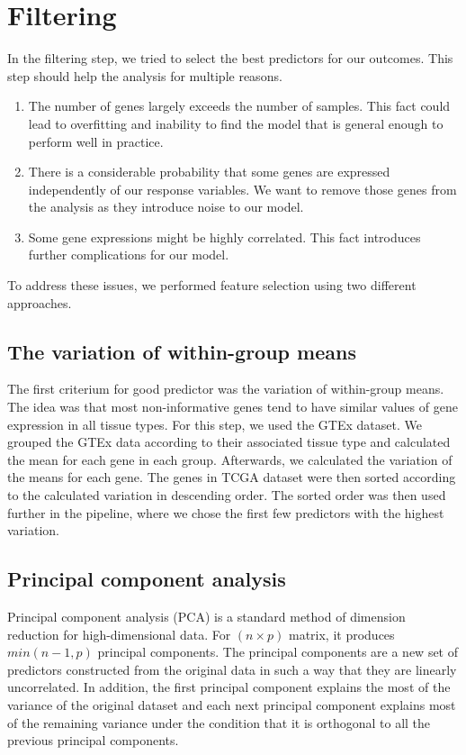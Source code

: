 \section{Filtering}
In the filtering step, we tried to select the best predictors for our outcomes.
This step should help the analysis for multiple reasons.
\begin{enumerate}
    \item The number of genes largely exceeds the number of samples. This fact could lead to overfitting and inability to find the model that is general enough to perform well in practice.
    \item There is a considerable probability that some genes are expressed independently of our response variables. We want to remove those genes from the analysis as they introduce noise to our model.
    \item Some gene expressions might be highly correlated. This fact introduces further complications for our model.
\end{enumerate}
To address these issues, we performed feature selection using two different approaches.

\subsection{The variation of within-group means}
The first criterium for good predictor was the variation of within-group means.
The idea was that most non-informative genes tend to have similar values of gene expression in all tissue types.
For this step, we used the GTEx dataset.
We grouped the GTEx data according to their associated tissue type and calculated the mean for each gene in each group.
Afterwards, we calculated the variation of the means for each gene.
The genes in TCGA dataset were then sorted according to the calculated variation in descending order.
The sorted order was then used further in the pipeline, where we chose the first few predictors with the highest variation.

\subsection{Principal component analysis}
Principal component analysis (PCA) is a standard method of dimension reduction for high-dimensional data. 
For $(n\times p)$ matrix, it produces $min(n-1, p)$ principal components.
The principal components are a new set of predictors constructed from the original data in such a way that they are linearly uncorrelated.
In addition, the first principal component explains the most of the variance of the original dataset and each next principal component explains most of the remaining variance under the condition that it is orthogonal to all the previous principal components. 

